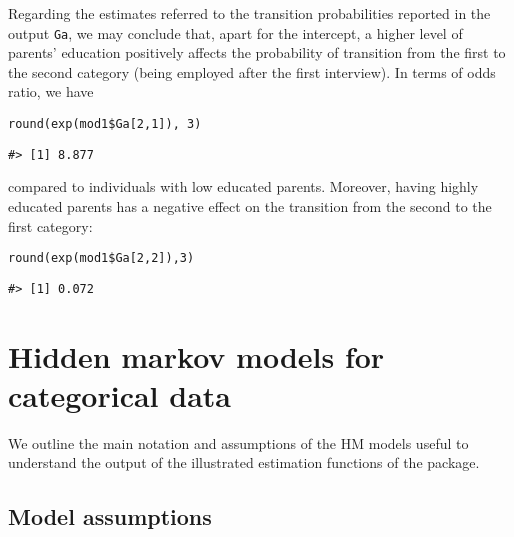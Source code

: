 Regarding the estimates referred to the transition probabilities
reported in the output \texttt{Ga}, we may conclude that, apart for the
intercept, a higher level of parents' education positively affects the
probability of transition from the first to the second category (being
employed after the first interview). In terms of odds ratio, we have

\begin{verbatim}
round(exp(mod1$Ga[2,1]), 3)
\end{verbatim}

\begin{verbatim}
#> [1] 8.877
\end{verbatim}

\noindent compared to individuals with low educated parents. Moreover,
having highly educated parents has a negative effect on the transition
from the second to the first category:

\begin{verbatim}
round(exp(mod1$Ga[2,2]),3)
\end{verbatim}

\begin{verbatim}
#> [1] 0.072
\end{verbatim}

\hypertarget{sec:HMmod}{%
\section{Hidden markov models for categorical data}\label{sec:HMmod}}

We outline the main notation and assumptions of the HM models useful to understand the output of the illustrated estimation functions of the  package.

\hypertarget{sec:HMassump}{%
\subsection{Model assumptions}\label{sec:HMassump}}

